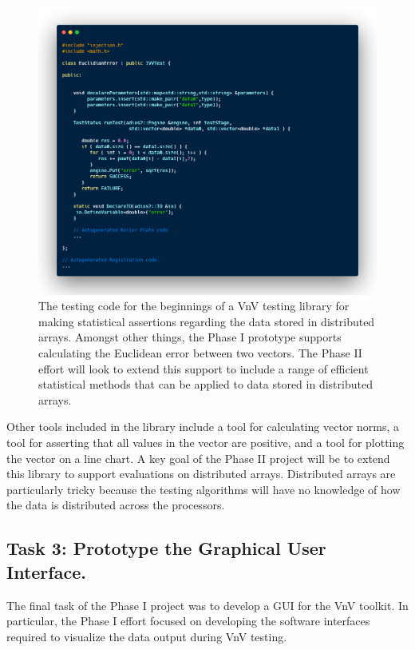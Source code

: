 \begin{figure}
 \includegraphics[width=\textwidth]{./Figures/euclid-test.png}
\caption{ The testing code for the beginnings of a VnV testing library for making statistical assertions regarding the data stored in distributed arrays. Amongst other things,
the Phase I prototype supports calculating the Euclidean error between two vectors. The Phase II effort will look to extend this support to include a range of efficient statistical
methods that can be applied to data stored in distributed arrays. \label{fig:euclid_test}}
 \end{figure}

Other tools included in the library include a tool for calculating vector norms, a tool for asserting that all values in the vector are positive, 
and a tool for plotting the vector on a line chart. A key goal of the Phase II project will be to extend this library to support evaluations on distributed arrays. Distributed arrays are particularly 
tricky because the testing algorithms will have no knowledge of how the data is distributed across the processors. 

\subsection{Task 3: Prototype the Graphical User Interface.} 

The final task of the Phase I project was to develop a GUI for the VnV toolkit. In particular, the Phase I effort focused on developing the software interfaces
required to visualize the data output during VnV testing. 

